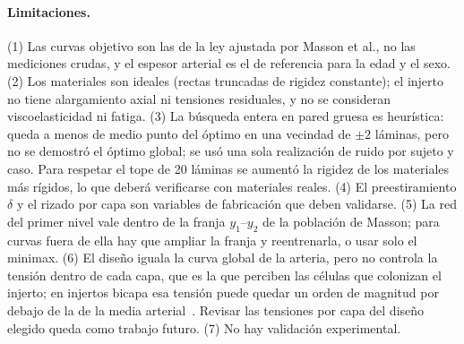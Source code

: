 \paragraph{Limitaciones.} (1) Las curvas objetivo son las de la ley ajustada por Masson et al., no las mediciones crudas, y el espesor arterial es el de referencia para la edad y el sexo. (2) Los materiales son ideales (rectas truncadas de rigidez constante); el injerto no tiene alargamiento axial ni tensiones residuales, y no se consideran viscoelasticidad ni fatiga. (3) La búsqueda entera en pared gruesa es heurística: queda a menos de medio punto del óptimo en una vecindad de $\pm2$ láminas, pero no se demostró el óptimo global; se usó una sola realización de ruido por sujeto y caso. Para respetar el tope de 20 láminas se aumentó la rigidez de los materiales más rígidos, lo que deberá verificarse con materiales reales. (4) El preestiramiento $\delta$ y el rizado por capa son variables de fabricación que deben validarse. (5) La red del primer nivel vale dentro de la franja $y_1$--$y_2$ de la población de Masson; para curvas fuera de ella hay que ampliar la franja y reentrenarla, o usar solo el minimax. (6) El diseño iguala la curva global de la arteria, pero no controla la tensión dentro de cada capa, que es la que perciben las células que colonizan el injerto; en injertos bicapa esa tensión puede quedar un orden de magnitud por debajo de la de la media arterial~\cite{szafron17}. Revisar las tensiones por capa del diseño elegido queda como trabajo futuro. (7) No hay validación experimental.

